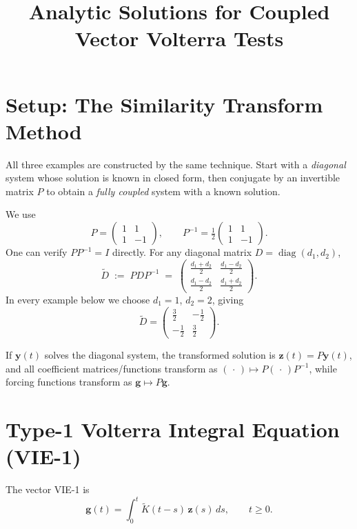 \documentclass[11pt]{article}
\title{Analytic Solutions for Coupled Vector Volterra Tests}
\author{}
\date{}
\begin{document}
\maketitle

\section*{Setup: The Similarity Transform Method}

All three examples are constructed by the same technique.  Start with a
\emph{diagonal} system whose solution is known in closed form, then conjugate
by an invertible matrix $P$ to obtain a \emph{fully coupled} system with a
known solution.

We use
\[
  P = \begin{pmatrix} 1 & 1 \\ 1 & -1 \end{pmatrix}, \qquad
  P^{-1} = \tfrac{1}{2}\begin{pmatrix} 1 & 1 \\ 1 & -1 \end{pmatrix}.
\]
One can verify $PP^{-1}=I$ directly.  For any diagonal matrix
$D = \operatorname{diag}(d_1, d_2)$,
\[
  \widetilde{D} \;:=\; PDP^{-1}
  \;=\;
  \begin{pmatrix} \tfrac{d_1+d_2}{2} & \tfrac{d_1-d_2}{2} \\[4pt]
                  \tfrac{d_1-d_2}{2} & \tfrac{d_1+d_2}{2} \end{pmatrix}.
\]
In every example below we choose $d_1=1$, $d_2=2$, giving
\[
  \widetilde{D}
  = \begin{pmatrix} \tfrac{3}{2} & -\tfrac{1}{2} \\[4pt]
                    -\tfrac{1}{2} & \tfrac{3}{2} \end{pmatrix}.
\]

If $\mathbf{y}(t)$ solves the diagonal system, the transformed solution is
$\mathbf{z}(t) = P\mathbf{y}(t)$, and all coefficient matrices/functions
transform as $(\,\cdot\,) \mapsto P(\,\cdot\,)P^{-1}$, while forcing
functions transform as $\mathbf{g} \mapsto P\mathbf{g}$.

\section{Type-1 Volterra Integral Equation (VIE-1)}

The vector VIE-1 is
\[
  \mathbf{g}(t) = \int_0^t \widetilde{K}(t-s)\,\mathbf{z}(s)\,ds,
  \qquad t\ge 0.
\]
\end{document}
